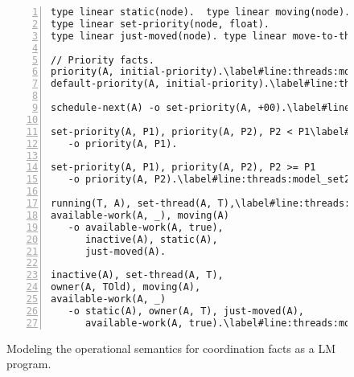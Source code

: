 \begin{figure}[h!]
\begin{Verbatim}[numbers=left,fontsize=\codesize,commandchars=\\\#\&]
type linear static(node).  type linear moving(node).
type linear set-priority(node, float).
type linear just-moved(node). type linear move-to-thread(node, thread).

// Priority facts.
priority(A, initial-priority).\label#line:threads:model_prio&
default-priority(A, initial-priority).\label#line:threads:model_defprio&

schedule-next(A) -o set-priority(A, +00).\label#line:threads:model_snext&

set-priority(A, P1), priority(A, P2), P2 < P1\label#line:threads:model_set1&
   -o priority(A, P1).

set-priority(A, P1), priority(A, P2), P2 >= P1
   -o priority(A, P2).\label#line:threads:model_set2&

running(T, A), set-thread(A, T),\label#line:threads:model_thread1&
available-work(A, _), moving(A)
   -o available-work(A, true),
      inactive(A), static(A),
      just-moved(A).

inactive(A), set-thread(A, T),
owner(A, TOld), moving(A),
available-work(A, _)
   -o static(A), owner(A, T), just-moved(A),
      available-work(A, true).\label#line:threads:model_thread2&
\end{Verbatim}
\caption{Modeling the operational semantics for coordination facts as a LM program.}
\label{code:threads:modeling_scheduling}
\end{figure}
